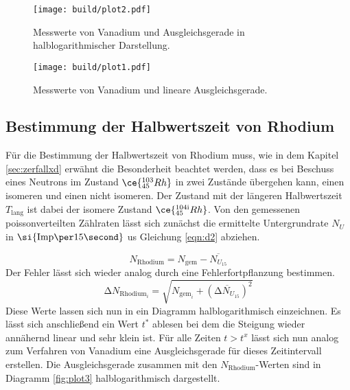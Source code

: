 
\begin{figure}[ht!]
  \centering
  \texttt{[image: build/plot2.pdf]}
  \caption{Messwerte von Vanadium und Ausgleichsgerade in halblogarithmischer Darstellung.}
  \label{fig:plot2}
\end{figure}
\begin{figure}[ht!]
  \centering
  \texttt{[image: build/plot1.pdf]}
  \caption{Messwerte von Vanadium und lineare Ausgleichsgerade.}
  \label{fig:plot1}
\end{figure}

\subsection{Bestimmung der Halbwertszeit von Rhodium}
Für die Bestimmung der Halbwertszeit von Rhodium muss, wie in dem Kapitel \ref{sec:zerfallxd} erwähnt die Besonderheit beachtet werden, dass es bei Beschuss eines Neutrons
im Zustand $\ce{^{103}_{45}Rh}$ in zwei Zustände übergehen kann, einen isomeren und einen nicht isomeren. Der Zustand mit der längeren Halbwertszeit $T_{\text{lang}}$
ist dabei der isomere Zustand $\ce{^{104{\text{i}}}_{45}Rh}$. Von den gemessenen poissonverteilten Zählraten lässt sich zunächst die ermittelte Untergrundrate $N_{U}$ in $\si{{\text{Imp\per}{15}}\second}$ 
us Gleichung \ref{eqn:d2} abziehen.

\begin{equation*}
N_{\text{Rhodium}} = N_{\text{gem}} - \overline{N_{U_{15}}}
\end{equation*}
Der Fehler lässt sich wieder analog durch eine Fehlerfortpflanzung bestimmen.
\begin{equation*}
\increment N_{{\text{Rhodium}_{i}}} = \sqrt{N_{{\text{gem}_{i}}} + (\overline{\increment N_{U_{15}}})^{2} }
\end{equation*}
Diese Werte lassen sich nun in ein Diagramm halblogarithmisch einzeichnen. Es lässt sich anschließend ein Wert $t^{*}$ ablesen bei dem die Steigung wieder annähernd
linear und sehr klein ist. Für alle Zeiten $t > t^{x}$ lässt sich nun analog zum Verfahren von Vanadium eine Ausgleichsgerade für dieses Zeitintervall erstellen.
Die Ausgleichsgerade zusammen mit den $N_{\text{Rhodium}}$-Werten sind in Diagramm \ref{fig:plot3} halblogarithmisch dargestellt.

